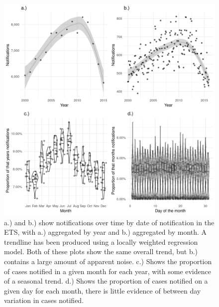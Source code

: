 \documentclass[11pt,twoside]{bristolthesis}
\begin{document}
  \begin{figure}
  
  {\centering \includegraphics[width=0.8\linewidth,]{chapters/tb-epi-england/figures/plot-detection-not} 
  
  }
  
  \caption[a.) and b.) show notifications over time by date of notification in the ETS, with a.) aggregated by year and  b.) aggregated by month.]{a.) and b.) show notifications over time by date of notification in the ETS, with a.) aggregated by year and  b.) aggregated by month. A trendline has been produced using a locally weighted regression model. Both of these plots show the same overall trend, but b.) contains a large amount of apparent noise. c.) Shows the proportion of cases notified in a given month for each year, with some evidence of a seasonal trend. d.) Shows the proportion of cases notified on a given day for each month, there is little evidence of between day variation in cases notified.}\label{fig:plot-detection-not}
  \end{figure}
\end{document}
